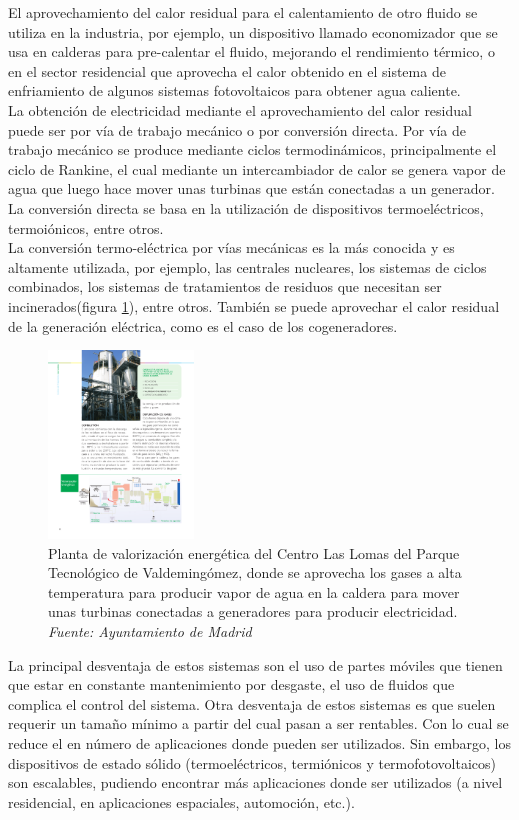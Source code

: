El aprovechamiento del calor residual para el calentamiento de otro fluido se utiliza en la industria, por ejemplo, un dispositivo llamado economizador que se usa en calderas para pre-calentar el fluido, mejorando el rendimiento térmico, o en el sector residencial que aprovecha el calor obtenido en el sistema de enfriamiento de algunos sistemas fotovoltaicos para obtener agua caliente.\\ 

La obtención de electricidad mediante el aprovechamiento del calor residual puede ser por vía de trabajo mecánico o por conversión directa. Por vía de trabajo mecánico se produce mediante ciclos termodinámicos, principalmente el ciclo de Rankine, el cual mediante un intercambiador de calor se genera vapor de agua que luego hace mover unas turbinas que están conectadas a un generador. La conversión directa se basa en la utilización de dispositivos termoeléctricos, termoiónicos, entre otros.\\

La conversión termo-eléctrica por vías mecánicas es la más conocida y es altamente utilizada, por ejemplo, las centrales nucleares, los sistemas de ciclos combinados, los sistemas de tratamientos de residuos que necesitan ser incinerados(figura \ref{fig:esquemaslomasvalorizacion}), entre otros. También se puede aprovechar el calor residual de la generación eléctrica, como es el caso de los cogeneradores.

\begin{figure}[H]
	\centering
	\includegraphics[height=5cm]{figuras/esquemasLomasValorizacion}
	\caption{Planta de valorización energética del Centro Las Lomas del Parque Tecnológico de Valdemingómez, donde se aprovecha los gases a alta temperatura para producir vapor de agua en la caldera para mover unas turbinas conectadas a generadores para producir electricidad. \textit{Fuente: Ayuntamiento de Madrid}}
	\label{fig:esquemaslomasvalorizacion}
\end{figure}
La principal desventaja de estos sistemas son el uso de partes móviles que tienen que estar en constante mantenimiento por desgaste, el uso de fluidos que complica el control del sistema. Otra desventaja de estos sistemas es que suelen requerir un tamaño mínimo a partir del cual pasan a ser rentables. Con lo cual se reduce el en número de aplicaciones donde pueden ser utilizados. Sin embargo, los dispositivos de estado sólido (termoeléctricos, termiónicos y termofotovoltaicos) son escalables, pudiendo encontrar más aplicaciones donde ser utilizados (a nivel residencial, en aplicaciones espaciales, automoción, etc.).\\

